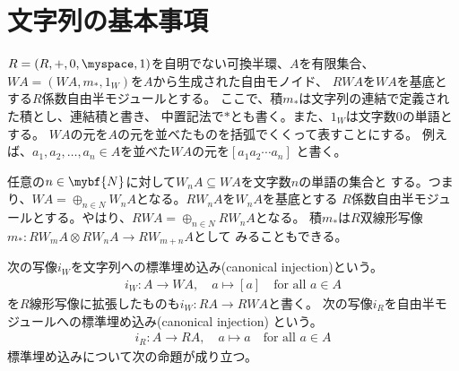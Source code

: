 \section{文字列の基本事項}\label{s1:文字列の基本事項} %
	$R=(R,+,0,\myspace,1)$を自明でない可換半環、$A$を有限集合、
	$WA=(WA,m_*,1_W)$を$A$から生成された自由モノイド、
	$RWA$を$WA$を基底とする$R$係数自由半モジュールとする。
	ここで、積$m_*$は文字列の連結で定義された積とし、連結積と書き、
	中置記法で$*$とも書く。また、$1_W$は文字数$0$の単語とする。
	$WA$の元を$A$の元を並べたものを括弧でくくって表すことにする。
	例えば、$a_1,a_2,\dots, a_n\in A$を並べた$WA$の元を$[a_1a_2\cdots a_n]$
	と書く。
	
	任意の$n\in\mybf{N}$に対して$W_nA\subseteq WA$を文字数$n$の単語の集合と
	する。つまり、$WA=\oplus_{n\in N}W_nA$となる。$RW_nA$を$W_nA$を基底とする
	$R$係数自由半モジュールとする。やはり、$RWA=\oplus_{n\in N}RW_nA$となる。
	積$m_*$は$R$双線形写像$m_*:RW_mA\otimes RW_nA\to RW_{m+n}A$として
	みることもできる。

	次の写像$i_W$を文字列への標準埋め込み(canonical injection)という。
	\begin{equation*}\begin{split} %
		i_W: A\to WA,\quad a\mapsto [a] \quad\text{for all }a\in A
	\end{split}\end{equation*} %
	を$R$線形写像に拡張したものも$i_W:RA\to RWA$と書く。
	次の写像$i_R$を自由半モジュールへの標準埋め込み(canonical injection)
	という。
	\begin{equation*}\begin{split} %
		i_R: A\to RA,\quad a\mapsto a \quad\text{for all }a\in A
	\end{split}\end{equation*} %
	標準埋め込みについて次の命題が成り立つ。

